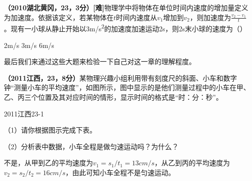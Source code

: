 \documentclass[12pt,twoside]{exam}
\begin{document}
\begin{knowledge}
\textbf{（2010湖北黄冈，23，3分）[难]}物理学中将物体在单位时间内速度的增加量定义为加速度。依据该定义，若某物体在$t$时间内速度从$v_1$增加到$v_2$，则加速度为{\large $\frac{v_2-v_1}{t}$}。现有一小球从静止开始以3\si{m/s^2}的加速度加速运动2s，则2s末小球的速度为（\answerline*[D]）

\begin{oneparchoices}
\choice 2m/s
\choice 3m/s
\choice 6m/s
\end{oneparchoices}

最后我们来通过这些大题来检验一下自己对这一章的理解程度。

\textbf{（2011江西，23，8分）}某物理兴趣小组利用带有刻度尺的斜面、小车和数字钟“测量小车的平均速度”，如图所示，图中显示的是他们测量过程中的小车在甲、乙、丙三个位置及其对应时间的情形，显示时间的格式是“时：分：秒”。
\begin{linefig}{2011江西23-1}
\end{linefig}

（1）请你根据图示完成下表。

\begin{table}[H]
\end{table}

（2）分析表中数据，小车全程是做匀速运动吗？为什么？
\begin{solutionorbox}[12ex]
不是，从甲到乙的平均速度为$v_1=s_1/t_1=13cm/s$，从乙到丙的平均速度为$v_2=s_2/t_2=16cm/s$，由此可知小车全程不是匀速运动。
\end{solutionorbox}


\end{knowledge}
\end{document}

